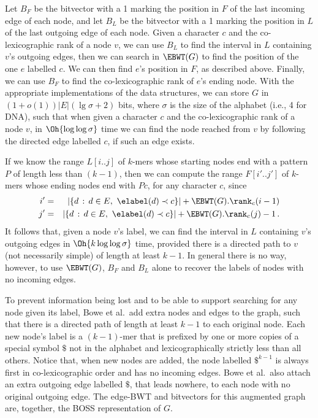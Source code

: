 Let $B_F$ be the bitvector with a 1 marking the position in $F$ of the last incoming edge of each node, and let $B_L$ be the bitvector with a 1 marking the position in $L$ of the last outgoing edge of each node.  Given a character $c$ and the co-lexicographic rank of a node $v$, we can use $B_L$ to find the interval in $L$ containing $v$'s outgoing edges, then we can search in \(\EBWT (G)\) to find the position of the one $e$ labelled $c$.  We can then find $e$'s position in $F$, as described above.  Finally, we can use $B_F$ to find the co-lexicographic rank of $e$'s ending node.  With the appropriate implementations of the data structures, we can store $G$ in \((1 + o (1)) |E| (\lg \sigma + 2)\) bits, where $\sigma$ is the size of the alphabet (i.e., 4 for DNA), such that when given a character $c$ and the co-lexicographic rank of a node $v$, in $\Oh{\log \log \sigma}$ time we can find the node reached from $v$ by following the directed edge labelled $c$, if such an edge exists.

If we know the range \(L [i..j]\) of $k$-mers whose starting nodes end with a pattern $P$ of length less than \((k - 1)\), then we can compute the range \(F [i'..j']\) of $k$-mers whose ending nodes end with \(P c\), for any character $c$, since
\begin{eqnarray*}
    i' & = & |\{d\,:\,d \in E,\ \elabel (d) \prec c\}| + \EBWT (G).\rank_c (i - 1)\\ 
    j' & = & |\{d\,:\,d \in E,\ \elabel (d) \prec c\}| + \EBWT (G).\rank_c (j) - 1\,.
\end{eqnarray*}
It follows that, given a node $v$'s label, we can find the interval in $L$ containing $v$'s outgoing edges in $\Oh{k \log \log \sigma}$ time, provided there is a directed path to $v$ (not necessarily simple) of length at least \(k - 1\).  In general there is no way, however, to use \(\EBWT (G)\), $B_F$ and $B_L$ alone to recover the labels of nodes with no incoming edges.

To prevent information being lost and to be able to support searching for any node given its label, Bowe et al.\ add extra nodes and edges to the graph, such that there is a directed path of length at least \(k - 1\) to each original node.  Each new node's label is a \((k - 1)\)-mer that is prefixed by one or more copies of a special symbol $\$$ not in the alphabet and lexicographically strictly less than all others.  Notice that, when new nodes are added, the node labelled $\$^{k - 1}$ is always first in co-lexicographic order and has no incoming edges.  Bowe et al.\ also attach an extra outgoing edge labelled $\$$, that leads nowhere, to each node with no original outgoing edge.  The edge-BWT and bitvectors for this augmented graph are, together, the BOSS representation of $G$.


